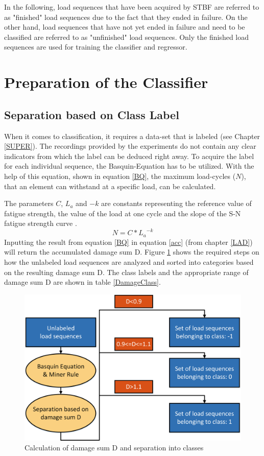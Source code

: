 In the following, load sequences that have been acquired by STBF are referred to as "finished" load sequences due to the fact that they ended in failure. On the other hand, load sequences that have not yet ended in failure and need to be classified are referred to as "unfinished" load sequences. Only the finished load sequences are used for training the classifier and regressor.


\section{Preparation of the Classifier}
\subsection{Separation based on Class Label}\label{SBOC}
When it comes to classification, it requires a data-set that is labeled (see Chapter \ref{SUPER}). The recordings provided by the experiments do not contain any clear indicators from which the label can be deduced right away. To acquire the label for each individual sequence, the Basquin-Equation \cite{DIN50100} has to be utilized. With the help of this equation, shown in equation \ref{BQ}, the maximum load-cycles (\(N\)), that an element can withstand at a specific load, can be calculated.

The parameters \(C\), \(L_a\) and \(-k\) are constants representing the reference value of fatigue strength, the value of the load at one cycle and the slope of the S-N fatigue strength curve \cite{SOLID}. 
\begin{equation}\label{BQ}
	N = {C}*{L_a}^{-k}
\end{equation}
Inputting the result from equation \ref{BQ} in equation \ref{acc} (from chapter \ref{LAD}) will return the accumulated damage sum D. Figure \ref{fig:SBC} shows the required steps on how the unlabeled load sequences are analyzed and sorted into categories based on the resulting damage sum D. The class labels and the appropriate range of damage sum D are shown in table \ref{DamageClass}.

\begin{figure}[H]
	\centering
	\includegraphics[width=0.8\linewidth]{IMGs/SBC.png}
	\caption{Calculation of damage sum D and separation into classes}
	\label{fig:SBC}
\end{figure}

